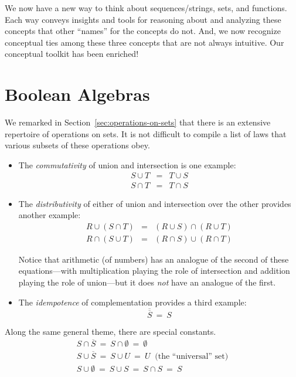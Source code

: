 We now have a new way to think about sequences/strings, sets, and functions.  Each way conveys insights and tools for reasoning about and analyzing these concepts that other ``names'' for the concepts do not.  And, we now recognize conceptual ties among these three concepts that are not always intuitive.  Our conceptual toolkit has been enriched!

\section{Boolean Algebras}
\label{sec:Boolean-Algebra}

We remarked in Section~\ref{sec:operations-on-sets} that there is an extensive repertoire of operations on sets.  It is not difficult to compile a list of laws that various subsets of these operations obey.
\begin{itemize}
\item
The {\em commutativity} of union and intersection is one example:
\begin{eqnarray*}
S \cup T & = & T \cup S \\
S \cap T & = & T \cap S
\end{eqnarray*}

\medskip\item
The {\em distributivity} of either of union and intersection over the other provides another example:
\begin{eqnarray*}
R \cup (S \cap T) & = & (R \cup S) \cap (R \cup T) \\
R \cap (S \cup T) & = & (R \cap S) \cup (R \cap T)
\end{eqnarray*}

\smallskip

Notice that arithmetic (of numbers) has an analogue of the second of these equations---with multiplication playing the role of intersection and addition playing the role of union---but it does {\em not} have an analogue of the first.

\medskip\item
The {\em idempotence} of complementation provides a third example:
\[ \overline{\overline{S}} \ = \ S \]
\end{itemize}
Along the same general theme, there are special constants.
\[
\begin{array}{l}
S \cap \overline{S} \ = \ S \cap \emptyset \ = \ \emptyset \\
S \cup \overline{S} \ = \ S \cup U \ = \ U \ \mbox{ (the ``universal'' set)} \\
S \cup \emptyset \ = \ S \cup S \ = \ S \cap S \ = \ S \\
\end{array}
\]

